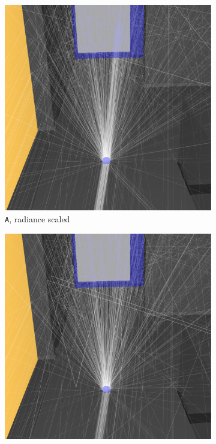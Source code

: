 \begin{figure}
	\centering
	\begin{subfigure}[t]{0.24\linewidth}
		\includegraphics[width=\textwidth]{chapters/chapter_results/correct2pathsscaled}
		\caption{\texttt{A}, radiance scaled}
		\label{correct2pathsscaled}
	\end{subfigure}
	\begin{subfigure}[t]{0.24\linewidth}
		\includegraphics[width=\textwidth]{chapters/chapter_results/wrong2pathsscaled}

\end{subfigure}
\end{figure}
